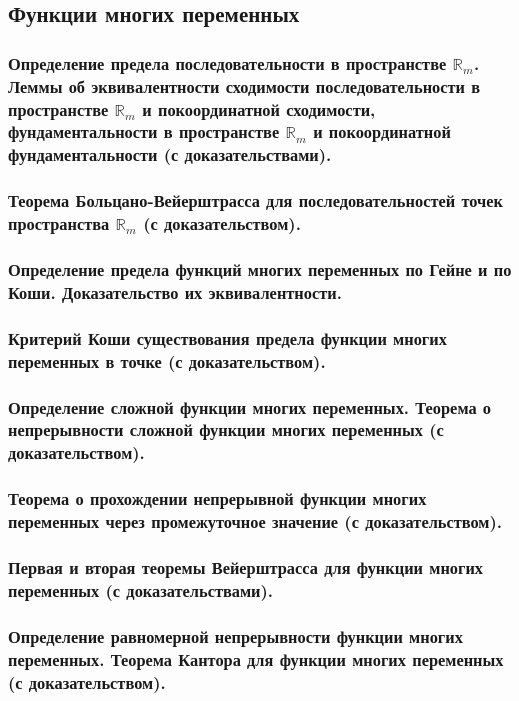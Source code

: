 \documentclass[10pt]{article}
\begin{document}
    \subsection{Функции многих переменных}
    \subsubsection{Определение предела последовательности в пространстве \texorpdfstring{$\mathbb{R}_m$}{Rm}. Леммы об эквивалентности сходимости последовательности в пространстве \texorpdfstring{$\mathbb{R}_m$}{Rm} и покоординатной сходимости, фундаментальности в пространстве \texorpdfstring{$\mathbb{R}_m$}{Rm} и покоординатной фундаментальности (с доказательствами).}
    \subsubsection{Теорема Больцано-Вейерштрасса для последовательностей точек пространства \texorpdfstring{$\mathbb{R}_m$}{Rm} (с доказательством).}
    \subsubsection{Определение предела функций многих переменных по Гейне и по Коши. Доказательство их эквивалентности.}
    \subsubsection{Критерий Коши существования предела функции многих переменных в точке (с доказательством).}
    \subsubsection{Определение сложной функции многих переменных. Теорема о непрерывности сложной функции многих переменных (с доказательством).}
    \subsubsection{Теорема о прохождении непрерывной функции многих переменных через промежуточное значение (с доказательством).}
    \subsubsection{Первая и вторая теоремы Вейерштрасса для функции многих переменных (с доказательствами).}
    \subsubsection{Определение равномерной непрерывности функции многих переменных. Теорема Кантора для функции многих переменных (с доказательством).}
\end{document}
